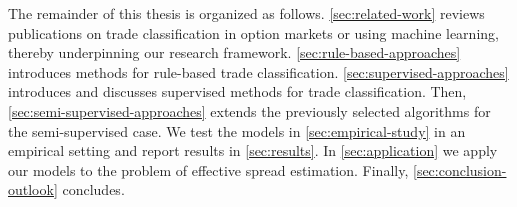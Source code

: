 
The remainder of this thesis is organized as follows. \cref{sec:related-work} reviews publications on trade classification in option markets or using machine learning, thereby underpinning our research framework. \cref{sec:rule-based-approaches} introduces methods for rule-based trade classification. \cref{sec:supervised-approaches} introduces and discusses supervised methods for trade classification. Then, \cref{sec:semi-supervised-approaches} extends the previously selected algorithms for the semi-supervised case. We test the models in \cref{sec:empirical-study} in an empirical setting and report results in \cref{sec:results}. In \cref{sec:application} we apply our models to the problem of effective spread estimation. Finally, \cref{sec:conclusion-outlook} concludes.
